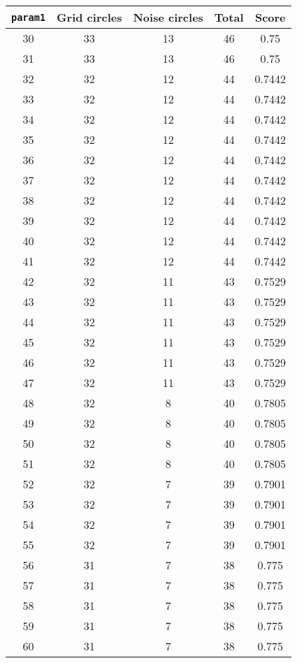 \documentclass[letterpaper, 12pt]{article}
\begin{document}
\begin{longtable}{|c|c|c|c|c|}
\hline
\textbf{\texttt{param1}} & \textbf{Grid circles} & \textbf{Noise circles} & \textbf{Total} & \textbf{Score} \\
\hline
30 & 33 & 13 & 46 & 0.75 \\
\hline
31 & 33 & 13 & 46 & 0.75 \\
\hline
32 & 32 & 12 & 44 & 0.7442 \\
\hline
33 & 32 & 12 & 44 & 0.7442 \\
\hline
34 & 32 & 12 & 44 & 0.7442 \\
\hline
35 & 32 & 12 & 44 & 0.7442 \\
\hline
36 & 32 & 12 & 44 & 0.7442 \\
\hline
37 & 32 & 12 & 44 & 0.7442 \\
\hline
38 & 32 & 12 & 44 & 0.7442 \\
\hline
39 & 32 & 12 & 44 & 0.7442 \\
\hline
40 & 32 & 12 & 44 & 0.7442 \\
\hline
41 & 32 & 12 & 44 & 0.7442 \\
\hline
42 & 32 & 11 & 43 & 0.7529 \\
\hline
43 & 32 & 11 & 43 & 0.7529 \\
\hline
44 & 32 & 11 & 43 & 0.7529 \\
\hline
45 & 32 & 11 & 43 & 0.7529 \\
\hline
46 & 32 & 11 & 43 & 0.7529 \\
\hline
47 & 32 & 11 & 43 & 0.7529 \\
\hline
48 & 32 & 8 & 40 & 0.7805 \\
\hline
49 & 32 & 8 & 40 & 0.7805 \\
\hline
50 & 32 & 8 & 40 & 0.7805 \\
\hline
51 & 32 & 8 & 40 & 0.7805 \\
\hline
52 & 32 & 7 & 39 & 0.7901 \\
\hline
53 & 32 & 7 & 39 & 0.7901 \\
\hline
54 & 32 & 7 & 39 & 0.7901 \\
\hline
55 & 32 & 7 & 39 & 0.7901 \\
\hline
56 & 31 & 7 & 38 & 0.775 \\
\hline
57 & 31 & 7 & 38 & 0.775 \\
\hline
58 & 31 & 7 & 38 & 0.775 \\
\hline
59 & 31 & 7 & 38 & 0.775 \\
\hline
60 & 31 & 7 & 38 & 0.775 \\
\hline

\end{longtable}
\end{document}
